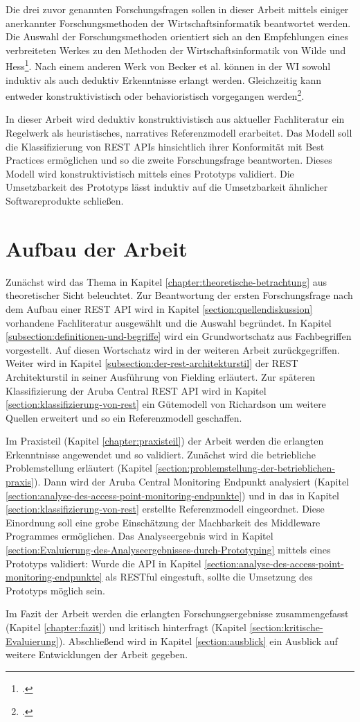 Die drei zuvor genannten Forschungsfragen sollen in dieser Arbeit mittels einiger anerkannter Forschungsmethoden der Wirtschaftsinformatik beantwortet werden. Die Auswahl der Forschungsmethoden orientiert sich an den Empfehlungen eines verbreiteten Werkes zu den Methoden der Wirtschaftsinformatik von Wilde und Hess\footcite[Vgl. ]{wilde_methodenspektrum_2006}. Nach einem anderen Werk von Becker et al. können in der WI sowohl induktiv als auch deduktiv Erkenntnisse erlangt werden. Gleichzeitig kann entweder konstruktivistisch oder behavioristisch vorgegangen werden\footcite[Vgl. ][S. 17f]{becker_forschungsmethodische_2003}.

In dieser Arbeit wird deduktiv konstruktivistisch aus aktueller Fachliteratur ein Regelwerk als heuristisches, narratives Referenzmodell erarbeitet. Das Modell soll die Klassifizierung von REST APIs hinsichtlich ihrer Konformität mit Best Practices ermöglichen und so die zweite Forschungsfrage beantworten. Dieses Modell wird konstruktivistisch mittels eines Prototyps validiert. Die Umsetzbarkeit des Prototyps lässt induktiv auf die Umsetzbarkeit ähnlicher Softwareprodukte schließen.
 
\section{Aufbau der Arbeit}\label{section:aufbau-der-arbeit}

Zunächst wird das Thema in Kapitel \ref{chapter:theoretische-betrachtung} aus theoretischer Sicht beleuchtet. Zur Beantwortung der ersten Forschungsfrage nach dem Aufbau einer REST API wird in Kapitel \ref{section:quellendiskussion} vorhandene Fachliteratur ausgewählt und die Auswahl begründet. In Kapitel \ref{subsection:definitionen-und-begriffe} wird ein Grundwortschatz aus Fachbegriffen vorgestellt. Auf diesen Wortschatz wird in der weiteren Arbeit zurückgegriffen. Weiter wird in Kapitel \ref{subsection:der-rest-architekturstil} der REST Architekturstil in seiner Ausführung von Fielding erläutert. Zur späteren Klassifizierung der Aruba Central REST API wird in Kapitel \ref{section:klassifizierung-von-rest} ein Gütemodell von Richardson um weitere Quellen erweitert und so ein Referenzmodell geschaffen.

Im Praxisteil (Kapitel \ref{chapter:praxisteil}) der Arbeit werden die erlangten Erkenntnisse angewendet und so validiert. Zunächst wird die betriebliche Problemstellung erläutert (Kapitel \ref{section:problemstellung-der-betrieblichen-praxis}). Dann wird der Aruba Central Monitoring Endpunkt analysiert (Kapitel \ref{section:analyse-des-access-point-monitoring-endpunkte}) und in das in Kapitel \ref{section:klassifizierung-von-rest} erstellte Referenzmodell eingeordnet. Diese Einordnung soll eine grobe Einschätzung der Machbarkeit des Middleware Programmes ermöglichen. Das Analyseergebnis wird in Kapitel \ref{section:Evaluierung-des-Analyseergebnisses-durch-Prototyping} mittels eines Prototyps validiert: Wurde die API in Kapitel \ref{section:analyse-des-access-point-monitoring-endpunkte} als RESTful eingestuft, sollte die Umsetzung des Prototyps möglich sein.

Im Fazit der Arbeit werden die erlangten Forschungsergebnisse zusammengefasst (Kapitel \ref{chapter:fazit}) und kritisch hinterfragt (Kapitel \ref{section:kritische-Evaluierung}). Abschließend wird in Kapitel \ref{section:ausblick} ein Ausblick auf weitere Entwicklungen der Arbeit gegeben.





